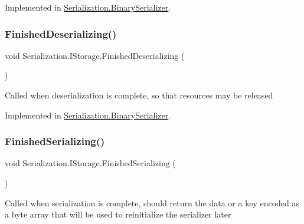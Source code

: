 Implemented in \hyperlink{class_serialization_1_1_binary_serializer_ad89d25a0b56c1b568f6696ab8d04d10b}{Serialization.\+Binary\+Serializer}.

\mbox{\label{interface_serialization_1_1_i_storage_affc5c4e5bc5efaf0f1840943358b6bc9}} 
\subsubsection{\texorpdfstring{Finished\+Deserializing()}{FinishedDeserializing()}}
{\footnotesize\ttfamily void Serialization.\+I\+Storage.\+Finished\+Deserializing (\begin{DoxyParamCaption}{ }\end{DoxyParamCaption})}



Called when deserialization is complete, so that resources may be released 



Implemented in \hyperlink{class_serialization_1_1_binary_serializer_af70f7fb26c0b41d0f1126634df2de03a}{Serialization.\+Binary\+Serializer}.

\mbox{\label{interface_serialization_1_1_i_storage_a5a9811117c5fba81ff98854cfa2c48e1}} 
\subsubsection{\texorpdfstring{Finished\+Serializing()}{FinishedSerializing()}}
{\footnotesize\ttfamily void Serialization.\+I\+Storage.\+Finished\+Serializing (\begin{DoxyParamCaption}{ }\end{DoxyParamCaption})}



Called when serialization is complete, should return the data or a key encoded as a byte array that will be used to reinitialize the serializer later 


